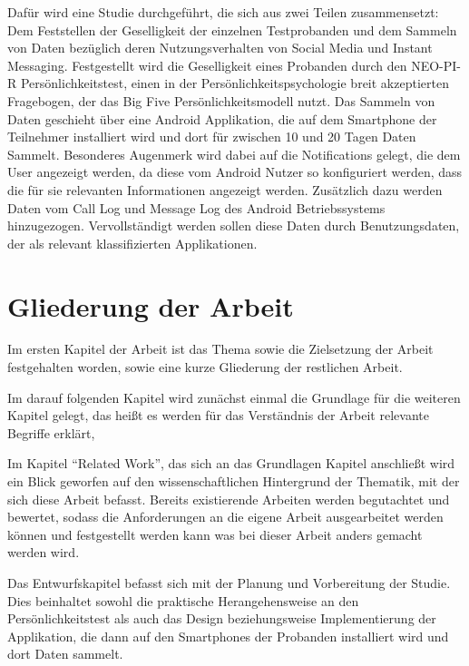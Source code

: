 Dafür wird eine Studie durchgeführt, die sich aus zwei Teilen zusammensetzt:
Dem Feststellen der Geselligkeit der einzelnen Testprobanden und dem Sammeln von Daten bezüglich deren Nutzungsverhalten von Social Media und Instant Messaging. 
Festgestellt wird die Geselligkeit eines Probanden durch den NEO-PI-R Persönlichkeitstest, einen in der Persönlichkeitspsychologie breit akzeptierten Fragebogen, der das Big Five Persönlichkeitsmodell nutzt.
Das Sammeln von Daten geschieht über eine Android Applikation, die auf dem Smartphone der Teilnehmer installiert wird und dort für zwischen 10 und 20 Tagen Daten Sammelt.
Besonderes Augenmerk wird dabei auf die Notifications gelegt, die dem User angezeigt werden, da diese vom Android Nutzer so konfiguriert werden, dass die für sie relevanten Informationen angezeigt werden.
Zusätzlich dazu werden Daten vom Call Log und Message Log des Android Betriebssystems hinzugezogen.
Vervollständigt werden sollen diese Daten durch Benutzungsdaten, der als relevant klassifizierten Applikationen.


\section{Gliederung der Arbeit}
\label{ch:Einleitung:sec:Gliederung}

Im ersten Kapitel der Arbeit ist das Thema sowie die Zielsetzung der Arbeit festgehalten worden, sowie eine kurze Gliederung der restlichen Arbeit.
\par

Im darauf folgenden Kapitel wird zunächst einmal die Grundlage für die weiteren Kapitel gelegt, das heißt
es werden für das Verständnis der Arbeit relevante Begriffe erklärt, 
\par


Im Kapitel "`Related Work"', das sich an das Grundlagen Kapitel anschließt wird ein Blick geworfen auf den wissenschaftlichen Hintergrund der Thematik,
 mit der sich diese Arbeit befasst.
Bereits existierende Arbeiten werden begutachtet und bewertet, sodass die Anforderungen an die eigene Arbeit ausgearbeitet werden können und festgestellt werden kann was bei dieser Arbeit anders gemacht werden wird.
\par

Das Entwurfskapitel befasst sich mit der Planung und Vorbereitung der Studie.
Dies beinhaltet sowohl die praktische Herangehensweise an den Persönlichkeitstest als auch das Design beziehungsweise Implementierung der Applikation,
die dann auf den Smartphones der Probanden installiert wird und dort Daten sammelt. 

